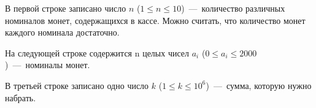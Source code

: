 В первой строке записано число $n$ ($1 \le n \le 10$)~---~количество различных
номиналов монет, содержащихся в кассе. Можно считать, что количество монет каждого номинала
достаточно.

На следующей строке содержится n целых чисел $a_i$ ($0 \le a_i \le 2000$)~---~номиналы монет.

В третьей строке записано одно число $k$ ($1 \le k \le 10^6$)~---~сумма, которую нужно набрать.
